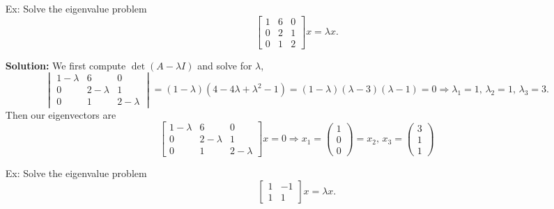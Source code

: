 \documentclass[reqno]{amsart}
\theoremstyle{definition}
\begin{document}
\begin{enumerate}

\item[Ex:  ]  Solve the eigenvalue problem
%
\begin{equation*}
\begin{bmatrix}
1 & 6 & 0\\
0 & 2 & 1\\
0 & 1 & 2
\end{bmatrix}x = \lambda x.
\end{equation*}
%

\textbf{Solution:  }  We first compute $\det(A-\lambda I)$ and solve for $\lambda$,
%
\begin{equation*}
\begin{vmatrix}
1-\lambda & 6 & 0\\
0 & 2-\lambda & 1\\
0 & 1 & 2-\lambda
\end{vmatrix} = (1-\lambda)(4-4\lambda + \lambda^2 - 1) = (1-\lambda)(\lambda - 3)(\lambda - 1) = 0
\Rightarrow \lambda_1 = 1,\, \lambda_2 = 1,\, \lambda_3 = 3.
\end{equation*}
%
Then our eigenvectors are
%
\begin{equation*}
\begin{bmatrix}
1 - \lambda & 6 & 0\\
0 & 2-\lambda & 1\\
0 & 1 & 2-\lambda
\end{bmatrix}x = 0 \Rightarrow x_1 = \begin{pmatrix}
1\\
0\\
0
\end{pmatrix} = x_2,\, x_3 = \begin{pmatrix}
3\\
1\\
1
\end{pmatrix}
\end{equation*}

\item[Ex:  ]  Solve the eigenvalue problem
%
\begin{equation*}
\begin{bmatrix}
1 & -1\\
1 & 1
\end{bmatrix}x = \lambda x.
\end{equation*}
%


\end{enumerate}
\end{document}
